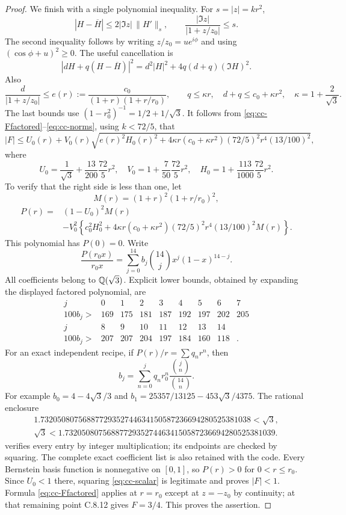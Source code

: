 \begin{proof}
We finish with a single polynomial inequality. For $s=|z|=kr^2$,
\[
 |H-\overline H|\le2|\Im z|\,\|H'\|_s,\qquad
 \frac{|\Im z|}{|1+z/z_0|}\le s.
\]
The second inequality follows by writing $z/z_0=ue^{i\phi}$
and using $(\cos\phi+u)^2\ge0$. The useful cancellation is
\[
 |dH+q(H-\overline H)|^2
      =d^2|H|^2+4q(d+q)(\Im H)^2.
\]
Also
\[
 \frac d{|1+z/z_0|}\le
 e(r):=\frac{c_0}{(1+r)(1+r/r_0)},\qquad
 q\le\kappa r,\quad d+q\le c_0+\kappa r^2,
 \quad\kappa=1+\frac2{\sqrt3}.
\]
The last bounds use $(1-r_0^2)^{-1}=1/2+1/\sqrt3$.
It follows from \eqref{eq:cc-Ffactored}--\eqref{eq:cc-norms},
using $k<72/5$, that
\begin{equation}\label{eq:cc-scalar}
 |F|\le U_0(r)+V_0(r)
 \sqrt{e(r)^2H_0(r)^2+
       4\kappa r(c_0+\kappa r^2)(72/5)^2r^4(13/100)^2},
\end{equation}
where
\[
 U_0=\frac1{\sqrt3}+\frac{13}{200}\frac{72}{5}r^2,
 \quad V_0=1+\frac7{50}\frac{72}{5}r^2,
 \quad H_0=1+\frac{113}{1000}\frac{72}{5}r^2.
\]
To verify that the right side is less than one, let
\[
 M(r)=(1+r)^2(1+r/r_0)^2,
\]
\begin{equation}\label{eq:cc-P}
 \begin{aligned}
 P(r)={}&(1-U_0)^2M(r)\\
 &-V_0^2\left\{c_0^2H_0^2+
 4\kappa r(c_0+\kappa r^2)(72/5)^2r^4(13/100)^2M(r)\right\}.
 \end{aligned}
\end{equation}
This polynomial has $P(0)=0$. Write
\[
 \frac{P(r_0x)}{r_0x}
     =\sum_{j=0}^{14}b_j\binom{14}{j}x^j(1-x)^{14-j}.
\]
All coefficients belong to $\mathbb Q(\sqrt3)$. Explicit lower bounds,
obtained by expanding the displayed factored polynomial, are
\[
 \begin{array}{c|rrrrrrrr}
 j&0&1&2&3&4&5&6&7\\ \hline
 100b_j>&169&175&181&187&192&197&202&205\\[2pt]
 j&8&9&10&11&12&13&14&\\ \hline
 100b_j>&207&207&204&197&184&160&118&.
 \end{array}
\]
For an exact independent recipe, if $P(r)/r=\sum q_nr^n$,
then
\[
 b_j=\sum_{n=0}^j q_nr_0^n
                  \frac{\binom jn}{\binom{14}n}.
\]
For example $b_0=4-4\sqrt3/3$ and
$b_1=25357/13125-453\sqrt3/4375$. The rational enclosure
\[
 \begin{gathered}
 1.73205080756887729352744634150587236694280525381038<\sqrt3,\\
 \sqrt3<1.73205080756887729352744634150587236694280525381039.
 \end{gathered}
\]
verifies every entry by integer multiplication; its endpoints
are checked by squaring. The complete exact coefficient list is
also retained with the code. Every Bernstein basis function is
nonnegative on $[0,1]$, so $P(r)>0$ for $0<r\le r_0$.
Since $U_0<1$ there, squaring \eqref{eq:cc-scalar} is legitimate
and proves $|F|<1$. Formula \eqref{eq:cc-Ffactored} applies
at $r=r_0$ except at $z=-z_0$ by continuity; at that remaining
point C.8.12 gives $F=3/4$. This proves the assertion.
\end{proof}

